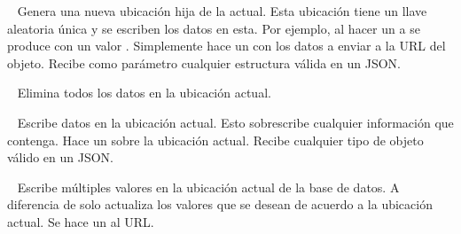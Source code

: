 
\begin{fulllineitems}
\label{\detokenize{nao_firebase:firebase.FirebaseDatabase.push}}~
Genera una nueva ubicación hija de la actual. Esta ubicación tiene un
llave aleatoria única y se escriben los datos en esta.
Por ejemplo, al hacer un  a 
se produce  con un valor .
Simplemente hace un  con los datos a enviar  a la URL del objeto. Recibe como parámetro cualquier estructura válida en un JSON.

\end{fulllineitems}


\begin{fulllineitems}
\label{\detokenize{nao_firebase:firebase.FirebaseDatabase.remove}}~
Elimina todos los datos en la ubicación actual.

\end{fulllineitems}


\begin{fulllineitems}
\label{\detokenize{nao_firebase:firebase.FirebaseDatabase.set}}~
Escribe datos en la ubicación actual. Esto sobrescribe cualquier información
que contenga.
Hace un  sobre la ubicación actual.
Recibe cualquier tipo de objeto válido en un JSON.

\end{fulllineitems}


\begin{fulllineitems}
\label{\detokenize{nao_firebase:firebase.FirebaseDatabase.update}}~
Escribe múltiples valores en la ubicación actual de la base de datos. A diferencia
de {\hyperref[\detokenize{nao_firebase:firebase.FirebaseDatabase.set}]{}} solo actualiza los valores que se desean de acuerdo a la ubicación
actual. Se hace un  al URL.
\newline
\end{fulllineitems}

